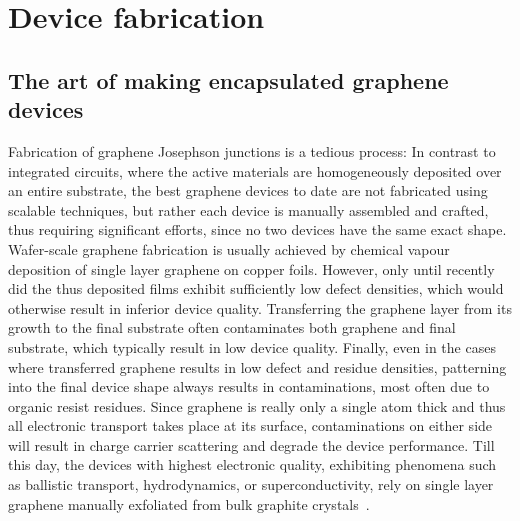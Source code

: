 \section{Device fabrication}
\label{sec:fabrication}

\subsection{The art of making encapsulated graphene devices}

Fabrication of graphene Josephson junctions is a tedious process:
% 
In contrast to integrated circuits, where the active materials are homogeneously deposited over an entire substrate, the best graphene devices to date are not fabricated using scalable techniques, but rather each device is manually assembled and crafted, thus requiring significant efforts, since no two devices have the same exact shape.
% 
Wafer-scale graphene fabrication is usually achieved by chemical vapour deposition of single layer graphene on copper foils.
% 
However, only until recently did the thus deposited films exhibit sufficiently low defect densities, which would otherwise result in inferior device quality.
% 
Transferring the graphene layer from its growth to the final substrate often contaminates both graphene and final substrate, which typically result in low device quality.
% 
Finally, even in the cases where transferred graphene results in low defect and residue densities, patterning into the final device shape always results in contaminations, most often due to organic resist residues.
% 
Since graphene is really only a single atom thick and thus all electronic transport takes place at its surface, contaminations on either side will result in charge carrier scattering and degrade the device performance.
% 
Till this day, the devices with highest electronic quality, exhibiting phenomena such as ballistic transport, hydrodynamics, or superconductivity, rely on single layer graphene manually exfoliated from bulk graphite crystals~\cite{???,???,???}.


